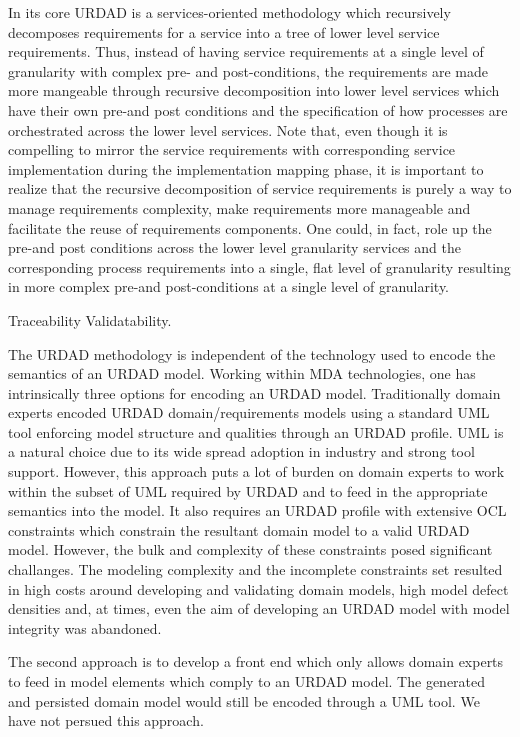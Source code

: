 In its core URDAD is a services-oriented methodology which recursively decomposes requirements for a service into a tree of lower level service requirements. Thus, instead of having service requirements at a single level of granularity with complex pre- and post-conditions, the requirements are made more mangeable through recursive decomposition into lower level services which have their own pre-and post conditions and the specification of how processes are orchestrated across the lower level services. Note that, even though it is compelling to mirror the service requirements with corresponding service implementation during the implementation mapping phase, it is important to realize that the recursive decomposition of service requirements is purely a way to manage requirements complexity, make requirements more manageable and facilitate the reuse of requirements components. One could, in fact, role up the pre-and post conditions across the lower level granularity services and the corresponding process requirements into a single, flat level of granularity resulting in more complex pre-and post-conditions at a single level of granularity.

Traceability
Validatability.


The URDAD methodology is independent of the technology used to encode the semantics of an URDAD model. Working within MDA technologies, one has intrinsically three options for encoding an URDAD model. Traditionally domain experts encoded URDAD domain/requirements models using a standard UML tool enforcing model structure and qualities through an URDAD profile. UML is a natural choice due to its wide spread adoption in industry and strong tool support. However, this approach puts a lot of burden on domain experts to work within the subset of UML required by URDAD and to feed in the appropriate semantics into the model. It also requires an URDAD profile with extensive OCL constraints which constrain the resultant domain model to a valid URDAD model. However, the bulk and complexity of these constraints posed significant challanges. The modeling complexity and the incomplete constraints set resulted in high costs around developing and validating domain models, high model defect densities and, at times, even the aim of developing an URDAD model with model integrity was abandoned.

The second approach is to develop a front end which only allows domain experts to feed in model elements which comply to an URDAD model. The generated and persisted domain model would still be encoded through a UML tool. We have not persued this approach.

